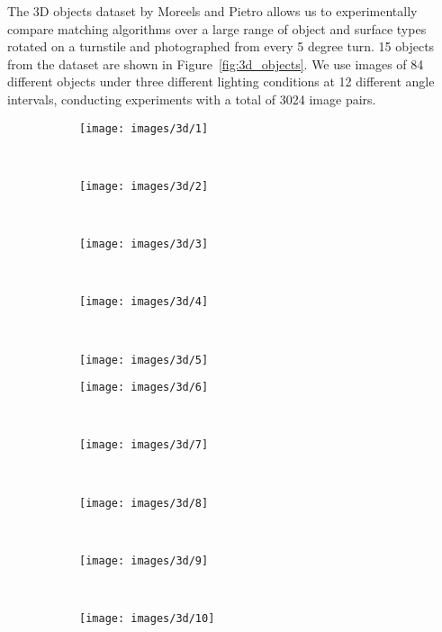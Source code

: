 \documentclass[10pt,journal,cspaper,compsoc]{IEEEtran}
\begin{document}
The 3D objects dataset by Moreels and Pietro \cite{moreels2007evaluation} allows us to experimentally compare matching 
algorithms over a large range of object and surface types rotated on a 
turnstile and photographed from every 5 degree turn.  15 objects from the dataset are shown in Figure~\ref{fig:3d_objects}.  We use images of 
84 different objects under three different lighting conditions at 12 
different angle intervals, conducting experiments with a total of 3024 
image pairs.  

\begin{figure}[htb]
    \begin{subfigure}[t]{0.19\columnwidth}
        \centering
        \texttt{[image: images/3d/1]}
    \end{subfigure}%
    ~ %
    \begin{subfigure}[t]{0.19\columnwidth}
        \centering
        \texttt{[image: images/3d/2]}
    \end{subfigure}%
    ~ %
    \begin{subfigure}[t]{0.19\columnwidth}
        \centering
        \texttt{[image: images/3d/3]}
    \end{subfigure}%
    ~ %
    \begin{subfigure}[t]{0.19\columnwidth}
        \centering
        \texttt{[image: images/3d/4]}
    \end{subfigure}%
    ~ %
    \begin{subfigure}[t]{0.19\columnwidth}
        \centering
        \texttt{[image: images/3d/5]}
    \end{subfigure}%
    \vspace{1.5 mm}

    \begin{subfigure}[t]{0.19\columnwidth}
        \centering
        \texttt{[image: images/3d/6]}
    \end{subfigure}%
    ~ %
    \begin{subfigure}[t]{0.19\columnwidth}
        \centering
        \texttt{[image: images/3d/7]}
    \end{subfigure}%
    ~ %
    \begin{subfigure}[t]{0.19\columnwidth}
        \centering
        \texttt{[image: images/3d/8]}
    \end{subfigure}%
    ~ %
    \begin{subfigure}[t]{0.19\columnwidth}
        \centering
        \texttt{[image: images/3d/9]}
    \end{subfigure}%
    ~ %
    \begin{subfigure}[t]{0.19\columnwidth}
        \centering
        \texttt{[image: images/3d/10]}
    \end{subfigure}%
    \vspace{1.5 mm}


\end{figure}
\end{document}
